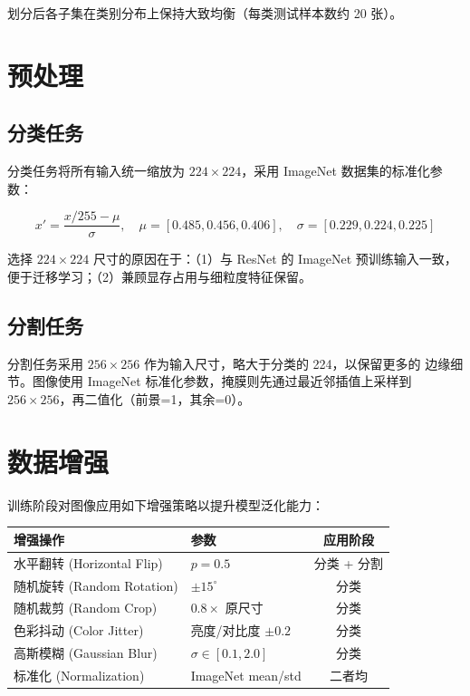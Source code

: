 \documentclass[12pt, a4paper, openany]{ctexbook}
\begin{document}
划分后各子集在类别分布上保持大致均衡（每类测试样本数约 20 张）。

\section{预处理}

\subsection{分类任务}

分类任务将所有输入统一缩放为 $224 \times 224$，采用 ImageNet 数据集的标准化参数：

\begin{equation}
  x' = \frac{x / 255 - \mu}{\sigma},\quad
  \mu = [0.485, 0.456, 0.406],\quad
  \sigma = [0.229, 0.224, 0.225]
\end{equation}

选择 $224 \times 224$ 尺寸的原因在于：（1）与 ResNet 的 ImageNet 预训练输入一致，
便于迁移学习；（2）兼顾显存占用与细粒度特征保留。

\subsection{分割任务}

分割任务采用 $256 \times 256$ 作为输入尺寸，略大于分类的 224，以保留更多的
边缘细节。图像使用 ImageNet 标准化参数，掩膜则先通过最近邻插值上采样到
$256 \times 256$，再二值化（前景=1，其余=0）。

\section{数据增强}

训练阶段对图像应用如下增强策略以提升模型泛化能力：

\begin{center}
\begin{tabular}{lL{6cm}c}
  \toprule
  \textbf{增强操作} & \textbf{参数} & \textbf{应用阶段} \\
  \midrule
  水平翻转 (Horizontal Flip) & $p=0.5$ & 分类 + 分割 \\
  随机旋转 (Random Rotation) & $\pm 15^{\circ}$ & 分类 \\
  随机裁剪 (Random Crop)     & $0.8 \times$ 原尺寸 & 分类 \\
  色彩抖动 (Color Jitter)    & 亮度/对比度 $\pm 0.2$ & 分类 \\
  高斯模糊 (Gaussian Blur)   & $\sigma \in [0.1, 2.0]$ & 分类 \\
  标准化 (Normalization)     & ImageNet mean/std & 二者均 \\
  \bottomrule
\end{tabular}
\end{center}
\end{document}
